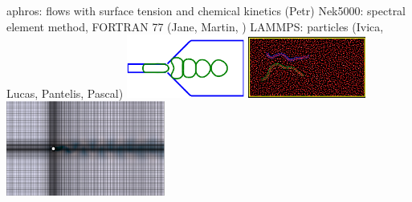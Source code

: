 \documentclass[aspectratio=169,8pt]{beamer}
\begin{document}
aphros: flows with surface tension and chemical kinetics (Petr)
\newline
Nek5000: spectral element method, FORTRAN 77 (Jane, Martin, )
\newline
LAMMPS: particles (Ivica, Lucas, Pantelis, Pascal)
\newline
\includegraphics[width=0.29\textwidth]{i/aphros.png}
\includegraphics[width=0.29\textwidth]{i/lammps.png}
\includegraphics[width=0.39\textwidth]{i/nek.png}
\eframe
\end{document}
